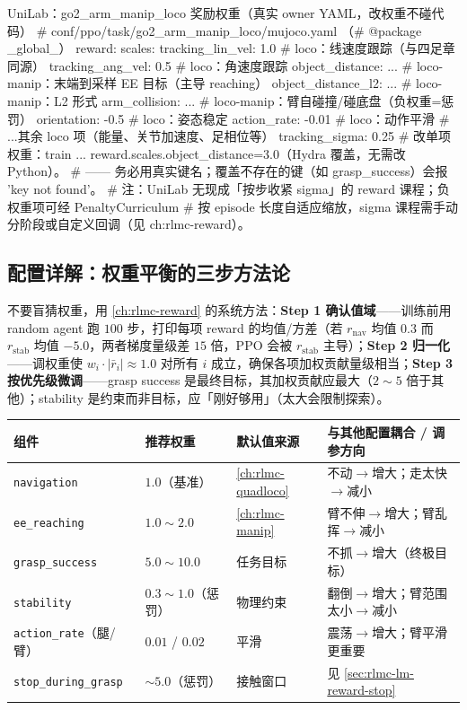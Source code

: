 \begin{codebox}[text]{UniLab：go2\_arm\_manip\_loco 奖励权重（真实 owner YAML，改权重不碰代码）}
# conf/ppo/task/go2_arm_manip_loco/mujoco.yaml （# @package _global_）
reward:
  scales:
    tracking_lin_vel:   1.0        # loco：线速度跟踪（与四足章同源）
    tracking_ang_vel:   0.5        # loco：角速度跟踪
    object_distance:    ...        # loco-manip：末端到采样 EE 目标（主导 reaching）
    object_distance_l2: ...        # loco-manip：L2 形式
    arm_collision:      ...        # loco-manip：臂自碰撞/碰底盘（负权重=惩罚）
    orientation:       -0.5        # loco：姿态稳定
    action_rate:       -0.01       # loco：动作平滑
    # ...其余 loco 项（能量、关节加速度、足相位等）
  tracking_sigma: 0.25
# 改单项权重：train ... reward.scales.object_distance=3.0（Hydra 覆盖，无需改 Python）。
#   —— 务必用真实键名；覆盖不存在的键（如 grasp_success）会报 'key not found'。
# 注：UniLab 无现成「按步收紧 sigma」的 reward 课程；负权重项可经 PenaltyCurriculum
#     按 episode 长度自适应缩放，sigma 课程需手动分阶段或自定义回调（见 ch:rlmc-reward）。
\end{codebox}

\subsection{配置详解：权重平衡的三步方法论}
\label{sec:rlmc-lm-reward-weight}

不要盲猜权重，用 \cref{ch:rlmc-reward} 的系统方法：\textbf{Step 1 确认值域}——训练前用 random agent 跑 $100$ 步，打印每项 reward 的均值/方差（若 $r_{\text{nav}}$ 均值 $0.3$ 而 $r_{\text{stab}}$ 均值 $-5.0$，两者梯度量级差 $15$ 倍，PPO 会被 $r_{\text{stab}}$ 主导）；\textbf{Step 2 归一化}——调权重使 $w_i\cdot|\bar r_i|\approx 1.0$ 对所有 $i$ 成立，确保各项加权贡献量级相当；\textbf{Step 3 按优先级微调}——grasp success 是最终目标，其加权贡献应最大（$2\!\sim\!5$ 倍于其他）；stability 是约束而非目标，应「刚好够用」（太大会限制探索）。

\begin{center}
\small
\begin{tabular}{@{}llll@{}}
\toprule
组件 & 推荐权重 & 默认值来源 & 与其他配置耦合 / 调参方向 \\
\midrule
\texttt{navigation} & $1.0$（基准） & \cref{ch:rlmc-quadloco} & 不动$\to$增大；走太快$\to$减小 \\
\texttt{ee\_reaching} & $1.0\!\sim\!2.0$ & \cref{ch:rlmc-manip} & 臂不伸$\to$增大；臂乱挥$\to$减小 \\
\texttt{grasp\_success} & $5.0\!\sim\!10.0$ & 任务目标 & 不抓$\to$增大（终极目标） \\
\texttt{stability} & $0.3\!\sim\!1.0$（惩罚） & 物理约束 & 翻倒$\to$增大；臂范围太小$\to$减小 \\
\texttt{action\_rate}（腿/臂） & $0.01$ / $0.02$ & 平滑 & 震荡$\to$增大；臂平滑更重要 \\
\texttt{stop\_during\_grasp} & $\sim\!5.0$（惩罚） & 接触窗口 & 见 \cref{sec:rlmc-lm-reward-stop} \\
\bottomrule
\end{tabular}
\end{center}

